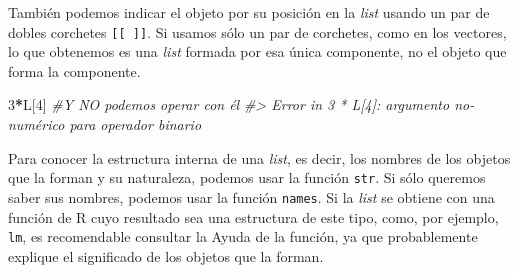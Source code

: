 \documentclass[
]{book}
\newenvironment{Shaded}{\begin{snugshade}}{\end{snugshade}}
\newcommand{\CommentTok}[1]{\textcolor[rgb]{0.56,0.35,0.01}{\textit{#1}}}
\newcommand{\DecValTok}[1]{\textcolor[rgb]{0.00,0.00,0.81}{#1}}
\newcommand{\NormalTok}[1]{#1}
\newcommand{\OperatorTok}[1]{\textcolor[rgb]{0.81,0.36,0.00}{\textbf{#1}}}
\theoremstyle{definition}
\theoremstyle{definition}
\theoremstyle{definition}
\theoremstyle{remark}
\begin{document}
\begin{Shaded}
\end{Shaded}

También podemos indicar el objeto por su posición en la \emph{list} usando un par de dobles corchetes \texttt{{[}{[}\ {]}{]}}. Si usamos sólo un par de corchetes, como en los vectores, lo que obtenemos es una \emph{list} formada por esa única componente, no el objeto que forma la componente.

\begin{Shaded}
\end{Shaded}

\begin{Shaded}
\begin{Highlighting}[]
\DecValTok{3}\OperatorTok{*}\NormalTok{L[}\DecValTok{4}\NormalTok{]   }\CommentTok{\#Y NO podemos operar con él}
\CommentTok{\#\textgreater{} Error in 3 * L[4]: argumento no{-}numérico para operador binario}
\end{Highlighting}
\end{Shaded}

Para conocer la estructura interna de una \emph{list}, es decir, los nombres de los objetos que la forman y su naturaleza, podemos usar la función \texttt{str}. Si sólo queremos saber sus nombres, podemos usar la función \texttt{names}. Si la \emph{list} se obtiene con una función de R cuyo resultado sea una estructura de este tipo, como, por ejemplo, \texttt{lm}, es recomendable consultar la Ayuda de la función, ya que probablemente explique el significado de los objetos que la forman.
\end{document}
